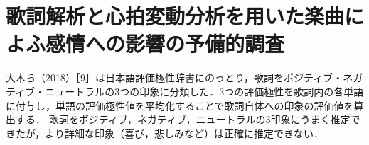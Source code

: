 \section{歌詞解析と心拍変動分析を用いた楽曲によふ感情への影響の予備的調査}
大木ら（2018）［9］は日本語評価極性辞書にのっとり，歌詞をポジティブ・ネガティブ・ニュートラルの3つの印象に分類した．3つの評価極性を歌詞内の各単語に付与し，単語の評価極性値を平均化することで歌詞自体への印象の評価値を算出する．
歌詞をポジティブ，ネガティブ，ニュートラルの3印象にうまく推定できたが，より詳細な印象（喜び，悲しみなど）は正確に推定できない．
